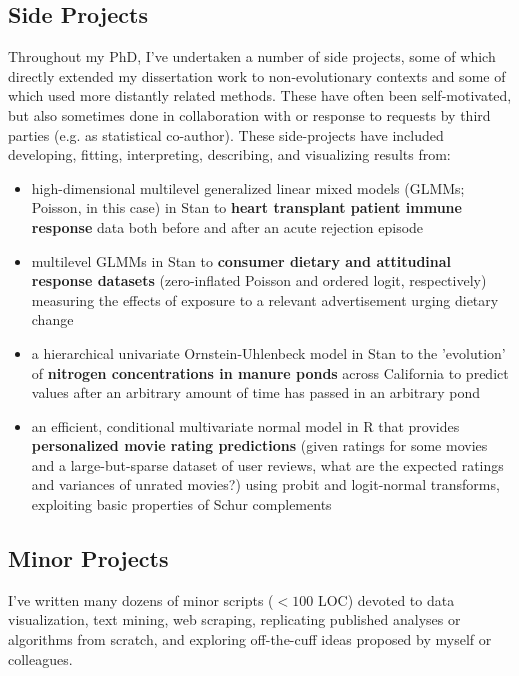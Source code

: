 \documentclass[12pt]{article}
\begin{document}
\subsection{Side Projects}

Throughout my PhD, I've undertaken a number of side projects, some of which directly extended my dissertation work to non-evolutionary contexts and some of which used more distantly related methods. These have often been self-motivated, but also sometimes done in collaboration with or response to requests by third parties (e.g. as statistical co-author). These side-projects have included developing, fitting,  interpreting, describing, and visualizing results from:

\begin{itemize}[noitemsep]

\item high-dimensional multilevel generalized linear mixed models (GLMMs; Poisson, in this case) in Stan to \textbf{heart transplant patient immune response} data both before and after an acute rejection episode
\item multilevel GLMMs in Stan to \textbf{consumer dietary and attitudinal response datasets} (zero-inflated Poisson and ordered logit, respectively) measuring the effects of exposure to a relevant advertisement urging dietary change
\item a hierarchical univariate Ornstein-Uhlenbeck model in Stan to the 'evolution' of \textbf{nitrogen concentrations in manure ponds} across California to predict values after an arbitrary amount of time has passed in an arbitrary pond
\item an efficient, conditional multivariate normal model in R that provides \textbf{personalized movie rating predictions} (given ratings for some movies and a large-but-sparse dataset of user reviews, what are the expected ratings and variances of unrated movies?) using probit and logit-normal transforms, exploiting basic properties of Schur complements

\end{itemize}

\subsection{Minor Projects}
I've written many dozens of minor scripts ($<100$ LOC) devoted to data visualization, text mining, web scraping, replicating published analyses or algorithms from scratch, and exploring off-the-cuff ideas proposed by myself or colleagues.
\end{document}
